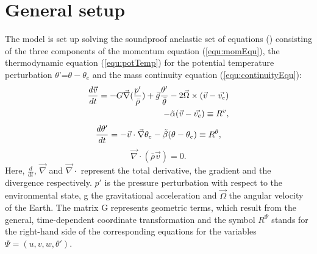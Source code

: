 \section{General setup}
\label{sec:eulag-setup}
The model is set up solving the soundproof anelastic set of equations (\cite{lipps_scale_1982}) consisting of the three components of the momentum equation (\ref{equ:momEqu}), the thermodynamic equation (\ref{equ:potTemp}) for the potential temperature perturbation $\theta$'=$\theta-\theta_e$ and the mass continuity equation (\ref{equ:continuityEqu}):
%
\begin{equation}
\begin{aligned}
    \frac{d \Vec{v}}{dt} = -G \Vec{\nabla} (\frac{p'}{\bar{\rho}}) +  \Vec{g} \frac{\theta'}{\bar{\theta}} - 2 \Vec{\Omega} \times (\Vec{v}-\Vec{v_e}) \\
    - \Tilde{\alpha} (\Vec{v}-\Vec{v_e}) \equiv R^{v},
    \label{equ:momEqu}
\end{aligned}
\end{equation}
%
\begin{equation}
    \frac{d \theta'}{dt} = -\Vec{v} \cdot \Vec{\nabla} \theta_e - \Tilde{\beta} (\theta-\theta_e) \equiv R^{\theta},
    \label{equ:potTemp}
\end{equation}
%
\begin{equation}
    \Vec{\nabla} \cdot (\bar{\rho} \Vec{v}) = 0.
    \label{equ:continuityEqu}
\end{equation}
%
Here, $\frac{d}{dt}$, $\Vec{\nabla}$ and $\Vec{\nabla} \cdot$ represent the total derivative, the gradient and the divergence respectively. $p'$ is the pressure perturbation with respect to the environmental state, g the gravitational acceleration and $\Vec{\Omega}$ the angular velocity of the Earth. The matrix G represents geometric terms, which result from the general, time-dependent coordinate transformation and the symbol $R^{\Psi}$ stands for the right-hand side of the corresponding equations for the variables $\Psi = (u,v,w,\theta')$.

